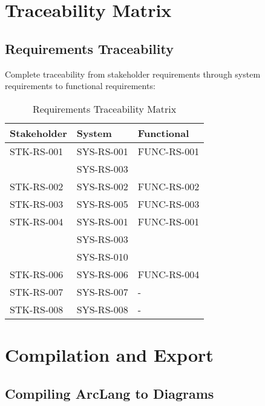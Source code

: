 \documentclass[11pt,a4paper]{article}
\begin{document}
\section{Traceability Matrix}

\subsection{Requirements Traceability}

Complete traceability from stakeholder requirements through system requirements to functional requirements:

\begin{table}[htbp]
\centering
\caption{Requirements Traceability Matrix}
\label{tab:traceability}
\begin{tabular}{|l|l|p{7cm}|}
\hline
\textbf{Stakeholder} & \textbf{System} & \textbf{Functional} \\
\hline
STK-RS-001 & SYS-RS-001 & FUNC-RS-001 \\
 & SYS-RS-003 & \\
\hline
STK-RS-002 & SYS-RS-002 & FUNC-RS-002 \\
\hline
STK-RS-003 & SYS-RS-005 & FUNC-RS-003 \\
\hline
STK-RS-004 & SYS-RS-001 & FUNC-RS-001 \\
 & SYS-RS-003 & \\
 & SYS-RS-010 & \\
\hline
STK-RS-006 & SYS-RS-006 & FUNC-RS-004 \\
\hline
STK-RS-007 & SYS-RS-007 & - \\
\hline
STK-RS-008 & SYS-RS-008 & - \\
\hline
\end{tabular}
\end{table}

\section{Compilation and Export}

\subsection{Compiling ArcLang to Diagrams}
\end{document}
